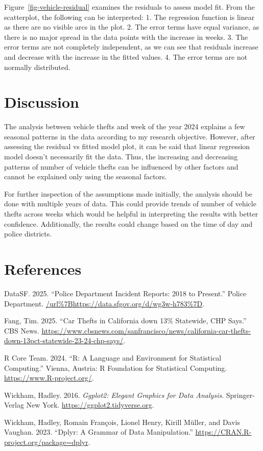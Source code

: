 \documentclass[
  letterpaper,
  DIV=11,
  numbers=noendperiod]{scrartcl}
\newlength{\cslhangindent}
\newenvironment{CSLReferences}[2] %
 {\begin{list}{}{%
  \setlength{\itemindent}{0pt}
  \setlength{\leftmargin}{0pt}
  \setlength{\parsep}{0pt}
  \ifodd #1
   \setlength{\leftmargin}{\cslhangindent}
   \setlength{\itemindent}{-1\cslhangindent}
  \fi
  \setlength{\itemsep}{#2\baselineskip}}}
 {\end{list}}
\begin{document}
Figure~\ref{fig-vehicle-residual} examines the residuals to assess model
fit. From the scatterplot, the following can be interpreted: 1. The
regression function is linear as there are no visible arcs in the plot.
2. The error terms have equal variance, as there is no major spread in
the data points with the increase in weeks. 3. The error terms are not
completely independent, as we can see that residuals increase and
decrease with the increase in the fitted values. 4. The error terms are
not normally distributed.

\section{Discussion}\label{sec-discussion}

The analysis between vehicle thefts and week of the year 2024 explains a
few seasonal patterns in the data according to my research objective.
However, after assessing the residual vs fitted model plot, it can be
said that linear regression model doesn't necessarily fit the data.
Thus, the increasing and decreasing patterns of number of vehicle thefts
can be influenced by other factors and cannot be explained only using
the seasonal factors.

For further inspection of the assumptions made initially, the analysis
should be done with multiple years of data. This could provide trends of
number of vehicle thefts across weeks which would be helpful in
interpreting the results with better confidence. Additionally, the
results could change based on the time of day and police districts.

\section*{References}\label{references}

\label{refs}
\begin{CSLReferences}{1}{0}
DataSF. 2025. {``Police Department Incident Reports: 2018 to Present.''}
Police Department. \url{/url\%7Bhttps://data.sfgov.org/d/wg3w-h783\%7D}.

Fang, Tim. 2025. {``Car Thefts in California down 13\% Statewide, CHP
Says.''} CBS News.
\url{https://www.cbsnews.com/sanfrancisco/news/california-car-thefts-down-13pct-statewide-23-24-chp-says/}.

R Core Team. 2024. {``R: A Language and Environment for Statistical
Computing.''} Vienna, Austria: R Foundation for Statistical Computing.
\url{https://www.R-project.org/}.

Wickham, Hadley. 2016. \emph{Ggplot2: Elegant Graphics for Data
Analysis}. Springer-Verlag New York.
\url{https://ggplot2.tidyverse.org}.

Wickham, Hadley, Romain François, Lionel Henry, Kirill Müller, and Davis
Vaughan. 2023. {``Dplyr: A Grammar of Data Manipulation.''}
\url{https://CRAN.R-project.org/package=dplyr}.

\end{CSLReferences}
\end{document}
